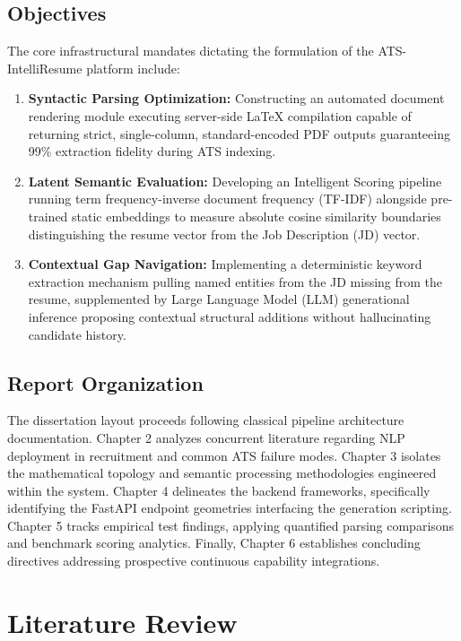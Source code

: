\documentclass[12pt,a4paper]{report}
\begin{document}
\section{Objectives}
The core infrastructural mandates dictating the formulation of the ATS-IntelliResume platform include:
\begin{enumerate}[label=\arabic*.]
    \item \textbf{Syntactic Parsing Optimization:} Constructing an automated document rendering module executing server-side LaTeX compilation capable of returning strict, single-column, standard-encoded PDF outputs guaranteeing 99\% extraction fidelity during ATS indexing.
    \item \textbf{Latent Semantic Evaluation:} Developing an Intelligent Scoring pipeline running term frequency-inverse document frequency (TF-IDF) alongside pre-trained static embeddings to measure absolute cosine similarity boundaries distinguishing the resume vector from the Job Description (JD) vector.
    \item \textbf{Contextual Gap Navigation:} Implementing a deterministic keyword extraction mechanism pulling named entities from the JD missing from the resume, supplemented by Large Language Model (LLM) generational inference proposing contextual structural additions without hallucinating candidate history.
\end{enumerate}

\section{Report Organization}
The dissertation layout proceeds following classical pipeline architecture documentation. Chapter 2 analyzes concurrent literature regarding NLP deployment in recruitment and common ATS failure modes. Chapter 3 isolates the mathematical topology and semantic processing methodologies engineered within the system. Chapter 4 delineates the backend frameworks, specifically identifying the FastAPI endpoint geometries interfacing the generation scripting. Chapter 5 tracks empirical test findings, applying quantified parsing comparisons and benchmark scoring analytics. Finally, Chapter 6 establishes concluding directives addressing prospective continuous capability integrations.

\chapter{Literature Review}
\end{document}
